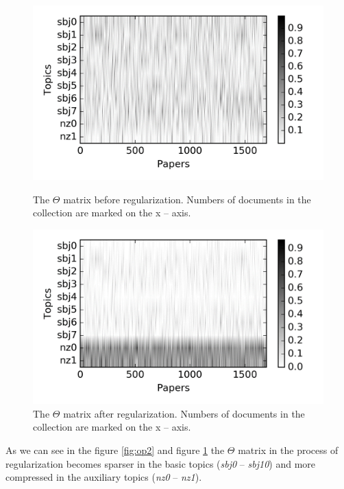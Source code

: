 \documentclass[12pt]{report}
\theoremstyle{definition}
\begin{document}
\begin{figure}
	\centering
	\begin{minipage}{.5\textwidth}
		\centering
		\includegraphics[width=0.95\linewidth]{op3fig2eng.png}
		\caption{The $\Theta$ matrix before regularization. Numbers of documents in the collection are marked on the x -- axis.}
		\label{fig:op2}
	\end{minipage}%
	\begin{minipage}{.5\textwidth}
		\centering
		\includegraphics[width=0.95\linewidth]{op3fig3eng.png}
		\caption{The $\Theta$ matrix after regularization. Numbers of documents in the collection are marked on the x -- axis.}
		\label{fig:op3}
	\end{minipage}
\end{figure}

As we can see in the figure \ref{fig:op2}  and figure \ref{fig:op3} the $\Theta$ matrix in the process of regularization becomes sparser in the basic topics (\textit{sbj0} -- \textit{sbj10}) and more compressed in the auxiliary topics (\textit{nz0} -- \textit{nz1}). 
\end{document}
